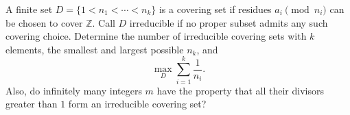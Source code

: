 A finite set $D=\{1<n_1<\cdots<n_k\}$ is a covering set if residues $a_i\pmod{n_i}$ can be chosen to cover $\mathbb Z$. Call $D$ irreducible if no proper subset admits any such covering choice. Determine the number of irreducible covering sets with $k$ elements, the smallest and largest possible $n_k$, and
\[\max_D\sum_{i=1}^k\frac1{n_i}.\]
Also, do infinitely many integers $m$ have the property that all their divisors greater than $1$ form an irreducible covering set?
